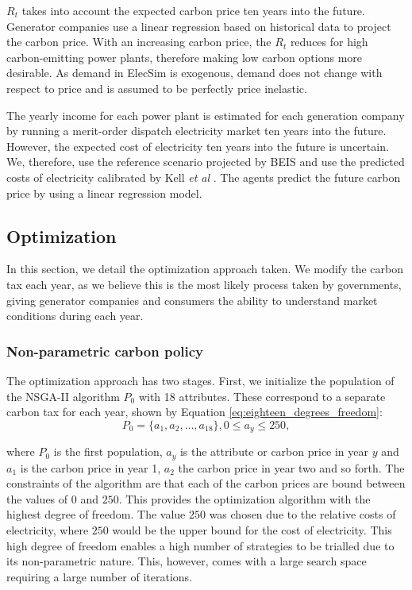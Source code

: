 $R_t$ takes into account the expected carbon price ten years into the future. Generator companies use a linear regression based on historical data to project the carbon price. With an increasing carbon price, the $R_t$ reduces for high carbon-emitting power plants, therefore making low carbon options more desirable. As demand in ElecSim is exogenous, demand does not change with respect to price and is assumed to be perfectly price inelastic. 

The yearly income for each power plant is estimated for each generation company by running a merit-order dispatch electricity market ten years into the future. However, the expected cost of electricity ten years into the future is uncertain. We, therefore, use the reference scenario projected by BEIS and use the predicted costs of electricity calibrated by Kell \textit{et al} \cite{DBEIS2019, Kell2020}. The agents predict the future carbon price by using a linear regression model.




\subsection{Optimization}

In this section, we detail the optimization approach taken. We modify the carbon tax each year, as we believe this is the most likely process taken by governments, giving generator companies and consumers the ability to understand market conditions during each year.

\label{ssec:optimization}
\subsubsection{Non-parametric carbon policy}
\label{sssec:non_parametric_strategy}
The optimization approach has two stages. First, we initialize the population of the NSGA-II algorithm $P_0$ with 18 attributes. These correspond to a separate carbon tax for each year, shown by Equation \ref{eq:eighteen_degrees_freedom}:
\begin{equation}
\label{eq:eighteen_degrees_freedom}
P_0=\{a_1,a_2,\ldots,a_{18}\}, 0\leq a_y\leq 250,
\end{equation} 

\noindent where $P_0$ is the first population, $a_y$ is the attribute or carbon price in year $y$ and $a_1$ is the carbon price in year 1, $a_2$ the carbon price in year two and so forth. The constraints of the algorithm are that each of the carbon prices are bound between the values of \textsterling$0$ and \textsterling$250$. This provides the optimization algorithm with the highest degree of freedom. The value \textsterling$250$ was chosen due to the relative costs of electricity, where \textsterling$250$ would be the upper bound for the cost of electricity. This high degree of freedom enables a high number of strategies to be trialled due to its non-parametric nature. This, however, comes with a large search space requiring a large number of iterations. 


